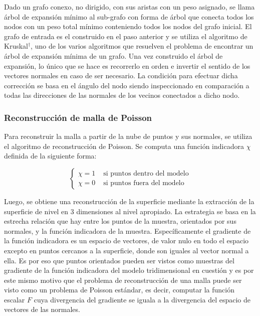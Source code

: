 Dado un grafo conexo, no dirigido, con sus aristas con un peso asignado, se llama árbol de expansión mínimo al sub-grafo con forma de árbol que conecta todos los nodos con un peso total mínimo conteniendo todos los nodos del grafo inicial. El grafo de entrada es el construido en el paso anterior y se utiliza el algoritmo de Kruskal$^\dagger$, uno de los varios algoritmos que resuelven el problema de encontrar un árbol de expansión mínima de un grafo.
Una vez construido el árbol de expansión, lo único que se hace es recorrerlo en orden e invertir el sentido de los vectores normales en caso de ser necesario. La condición para efectuar dicha corrección se basa en el ángulo del nodo siendo inspeccionado en comparación a todas las direcciones de las normales de los vecinos conectados a dicho nodo.

\subsubsection{Reconstrucción de malla de Poisson}

Para reconstruir la malla a partir de la nube de puntos y sus normales, se utiliza el algoritmo de reconstrucción de Poisson\cite{PoissonSR}.
Se computa una función indicadora $\chi$ definida de la siguiente forma:

$$
\left\{ \begin{array}{rl}
 \chi = 1 & \mbox{ si puntos dentro del modelo} \\
 \chi = 0 & \mbox{ si puntos fuera del modelo}
       \end{array} \right.
$$

Luego, se obtiene una reconstrucción de la superficie mediante la extracción de la superficie de nivel en 3 dimensiones al nivel apropiado.
La estrategia se basa en la estrecha relación que hay entre los puntos de la muestra, orientados por sus normales, y la función indicadora de la muestra. Específicamente el gradiente de la función indicadora es un espacio de vectores, de valor nulo en todo el espacio excepto en puntos cercanos a la superficie, donde son iguales al vector normal a ella.
Es por eso que puntos orientados pueden ser vistos como muestras del gradiente de la función indicadora del modelo tridimensional en cuestión y es por este mismo motivo que el problema de reconstrucción de una malla puede ser visto como un problema de Poisson estándar, es decir, computar la función escalar $F$ cuya divergencia del gradiente se iguala a la divergencia del espacio de vectores de las normales.
